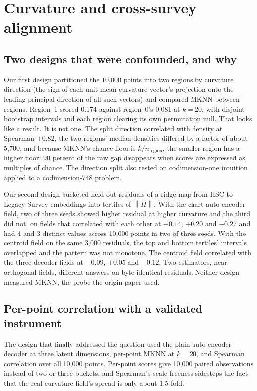 \documentclass[11pt,a4paper]{article}
\newcommand{\norm}[1]{\left\lVert #1 \right\rVert}
\begin{document}
\section{Curvature and cross-survey alignment}

\subsection{Two designs that were confounded, and why}

Our first design partitioned the 10{,}000 points into two regions by curvature direction (the sign of each unit mean-curvature vector's projection onto the leading principal direction of all such vectors) and compared MKNN between regions. Region~1 scored 0.174 against region~0's 0.081 at $k = 20$, with disjoint bootstrap intervals and each region clearing its own permutation null. That looks like a result. It is not one. The split direction correlated with density at Spearman $+0.82$, the two regions' median densities differed by a factor of about 5{,}700, and because MKNN's chance floor is $k/n_{\text{region}}$, the smaller region has a higher floor: 90 percent of the raw gap disappears when scores are expressed as multiples of chance. The direction split also rested on codimension-one intuition applied to a codimension-748 problem.

Our second design bucketed held-out residuals of a ridge map from HSC to Legacy Survey embeddings into tertiles of $\norm{H}$. With the chart-auto-encoder field, two of three seeds showed higher residual at higher curvature and the third did not, on fields that correlated with each other at $-0.14$, $+0.20$ and $-0.27$ and had 4 and 3 distinct values across 10{,}000 points in two of three seeds. With the centroid field on the same 3{,}000 residuals, the top and bottom tertiles' intervals overlapped and the pattern was not monotone. The centroid field correlated with the three decoder fields at $-0.09$, $+0.05$ and $-0.12$. Two estimators, near-orthogonal fields, different answers on byte-identical residuals. Neither design measured MKNN, the probe the origin paper used.

\subsection{Per-point correlation with a validated instrument}

The design that finally addressed the question used the plain auto-encoder decoder at three latent dimensions, per-point MKNN at $k = 20$, and Spearman correlation over all 10{,}000 points. Per-point scores give 10{,}000 paired observations instead of two or three buckets, and Spearman's scale-freeness sidesteps the fact that the real curvature field's spread is only about 1.5-fold.
\end{document}
